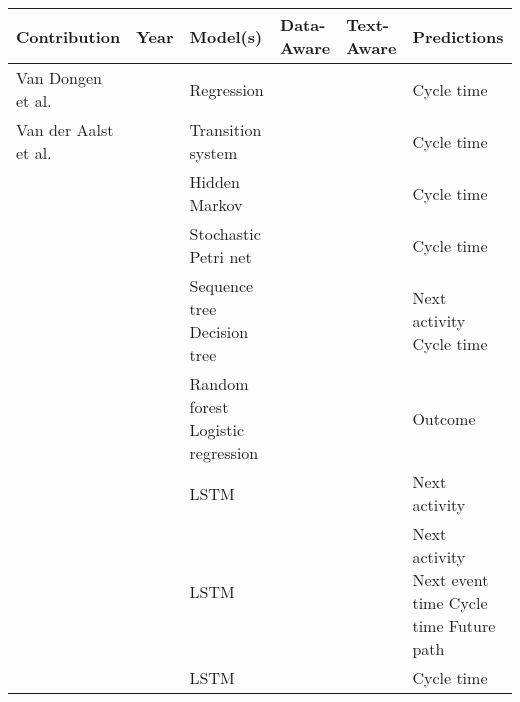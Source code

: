 \begin{table}[htbp!]
	\renewcommand{\arraystretch}{1.5}
	\begin{tabularx}{\textwidth}{
			>{\hsize=2.0\hsize}X
			>{\hsize=0.4\hsize}X
			>{\hsize=1.3\hsize}X
			>{\hsize=0.5\hsize}X
			>{\hsize=0.5\hsize}X
			>{\hsize=1.3\hsize}X
		}
		\toprule
		\textbf{Contribution} & \textbf{Year} & \textbf{Model(s)}  & \textbf{Data-Aware} &  \textbf{Text-Aware} & \textbf{Predictions} \\ \midrule
		Van Dongen et al. \cite{DBLP:conf/otm/DongenCA08}& \citeyear{DBLP:conf/otm/DongenCA08} & Regression  & \checkmark & \xmark& Cycle time\\
		
		Van der Aalst et al. \cite{DBLP:journals/is/AalstSS11}&  \citeyear{DBLP:journals/is/AalstSS11}& Transition system  
		& \xmark & \xmark & Cycle time \\   
		
		\citeauthor{DBLP:conf/colcom/PandeyNC11} \cite{DBLP:conf/colcom/PandeyNC11} & \citeyear{DBLP:conf/colcom/PandeyNC11} & Hidden Markov & \xmark & \xmark & Cycle time \\
		
		\citeauthor{DBLP:conf/icsoc/Rogge-SoltiW13} \cite{DBLP:conf/icsoc/Rogge-SoltiW13} & \citeyear{DBLP:conf/icsoc/Rogge-SoltiW13} &Stochastic Petri net & \xmark & \xmark & Cycle time\\
		
		\citeauthor{DBLP:conf/dis/CeciLFCM14} \cite{DBLP:conf/dis/CeciLFCM14} & \citeyear{DBLP:conf/dis/CeciLFCM14} & Sequence tree \newline Decision tree& \checkmark & \xmark & Next activity \newline Cycle time \\
		
		\citeauthor{DBLP:conf/bpm/TeinemaaDMF16}  \cite{DBLP:conf/bpm/TeinemaaDMF16} &  \citeyear{DBLP:conf/bpm/TeinemaaDMF16} & Random forest \newline Logistic regression & \checkmark & \checkmark & Outcome \\
		
		\citeauthor{ DBLP:conf/bpm/EvermannRF16} \cite{ DBLP:conf/bpm/EvermannRF16} &  \citeyear{ DBLP:conf/bpm/EvermannRF16}& LSTM & \xmark & \xmark & Next activity \\
		
		\citeauthor{DBLP:conf/caise/TaxVRD17} \cite{DBLP:conf/caise/TaxVRD17} & \citeyear{DBLP:conf/caise/TaxVRD17} & LSTM & \xmark & \xmark & Next activity \newline Next event time \newline Cycle time \newline Future path \\
		\citeauthor{DBLP:conf/ssci/NavarinVPS17} \cite{DBLP:conf/ssci/NavarinVPS17} &  \citeyear{DBLP:conf/ssci/NavarinVPS17}&  LSTM & \checkmark  & \xmark & Cycle time\\
		

\end{tabularx}
\end{table}
